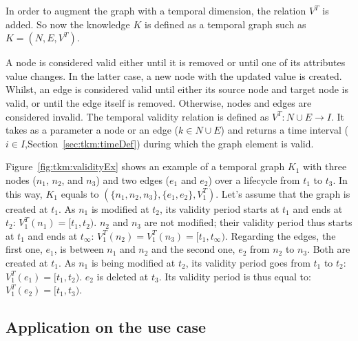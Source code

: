 In order to augment the graph with a temporal dimension, the relation $V^T$ is added.
So now the knowledge $K$ is defined as a temporal graph such as $K = (N, E, V^T)$.

A node is considered valid either until it is removed or until one of its attributes value changes. 
In the latter case, a new node with the updated value is created.
Whilst, an edge is considered valid until either its source node and target node is valid, or until the edge itself is removed.
Otherwise, nodes and edges are considered invalid.
The temporal validity relation is defined as $V^T: N \cup E \rightarrow I$.
It takes as a parameter a node or an edge ($k \in N \cup E$) and returns a time interval ($i \in I$,\cf Section~\ref{sec:tkm:timeDef}) during which the graph element is valid.

Figure~\ref{fig:tkm:validityEx} shows an example of a temporal graph $K_1$ with three nodes ($n_1$, $n_2$, and $n_3$) and two edges ($e_1$ and $e_2$) over a lifecycle from $t_1$ to $t_3$.
In this way, $K_1$ equals to $(\{n_1, n_2, n_3\}, \{e_1, e_2\}, V^{T}_1)$.
Let's assume that the graph is created at $t_1$.
As $n_1$ is modified at $t_2$, its validity period starts at $t_1$ and ends at $t_2$: $V^{T}_1(n_1) = [t_1, t_2)$.
$n_2$ and $n_3$ are not modified; their validity period thus starts at $t_1$ and ends at $t_\infty$: $V^{T}_1(n_2) = V^{T}_1(n_3) = [t_1, t_\infty)$.
Regarding the edges, the first one, $e_1$, is between $n_1$ and $n_2$ and the second one, $e_2$ from $n_2$ to $n_3$.
Both are created at $t_1$.
As $n_1$ is being modified at $t_2$, its validity period goes from $t_1$ to $t_2$:  $V^{T}_1(e_1) = [t_1, t_2)$.
$e_2$ is deleted at $t_3$.
Its validity period is thus equal to: $V^{T}_1(e_2) = [t_1, t_3)$.




















\subsection{Application on the use case}







